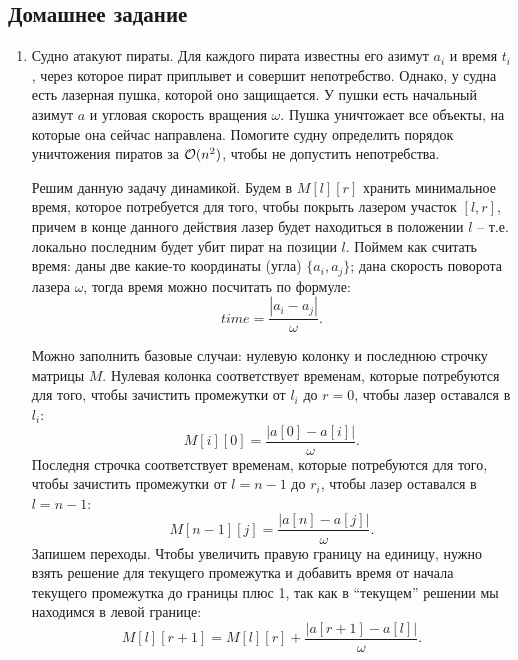 \subsection{Домашнее задание}
\begin{enumerate}
  \item {}
    Судно атакуют пираты. Для каждого пирата известны его азимут $a_i$
    и время $t_i$, через которое пират приплывет и совершит
    непотребство. Однако, у судна есть лазерная пушка, которой оно
    защищается. У пушки есть начальный азимут $a$ и угловая скорость
    вращения $\omega$. Пушка уничтожает все объекты, на которые она
    сейчас направлена. Помогите судну определить порядок уничтожения
    пиратов за $\mathcal{O}(n^2)$, чтобы не допустить непотребства.
  \begin{solution}
    Решим данную задачу динамикой. Будем в $M[l][r]$ хранить минимальное время, которое потребуется для того, чтобы покрыть лазером участок $[l, r]$, причем в конце данного действия лазер будет находиться в положении $l$ -- т.е. локально последним будет убит пират на позиции $l$. Поймем как считать время: даны две какие-то координаты (угла) $\{a_i, a_j\}$; дана скорость поворота лазера $\omega$, тогда время можно посчитать по формуле:
    \begin{equation}
      time = \dfrac{|a_i-a_j|}{\omega}.
    \end{equation}
  \end{solution}
  Можно заполнить базовые случаи: нулевую колонку и последнюю строчку матрицы $M$. Нулевая колонка соответствует временам, которые потребуются для того, чтобы зачистить промежутки от $l_i$ до $r=0$, чтобы лазер оставался в $l_i$:
  \begin{equation}
    M[i][0] = \dfrac{|a[0]-a[i]|}{\omega}.
  \end{equation}
  Последня строчка соответствует временам, которые потребуются для того, чтобы зачистить промежутки от $l=n-1$ до $r_i$, чтобы лазер оставался в $l=n-1$:
  \begin{equation}
    M[n-1][j] = \dfrac{|a[n]-a[j]|}{\omega}.
  \end{equation}
  Запишем переходы. Чтобы увеличить правую границу на единицу, нужно взять решение для текущего промежутка и добавить время от начала текущего промежутка до границы плюс 1, так как в ``текущем'' решении мы находимся в левой границе:
  \begin{equation}
    M[l][r+1] = M[l][r] + \dfrac{|a[r+1] - a[l]|}{\omega}.
  \end{equation}

\end{enumerate}

